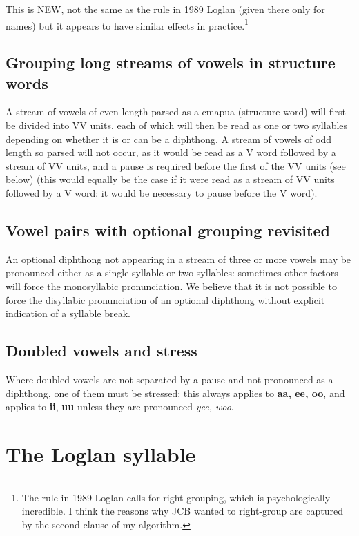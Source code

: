 \documentclass[12pt]{book}
\begin{document}
This is NEW, not the same as the rule in 1989 Loglan (given there only for names) but it appears to have similar effects in practice.\footnote{The rule in 1989 Loglan calls for right-grouping, which is psychologically incredible.  I think the reasons why JCB wanted to right-group are captured by the second clause of my algorithm.}

\subsection{Grouping long streams of vowels in structure words}

A stream of vowels of even length parsed as a cmapua (structure word) will first be divided into VV units, each of which will then be read as one or two syllables depending on whether it is or can be a diphthong.  A stream of vowels of odd length so parsed will not occur, as it would be read as a V word followed by a stream of VV units, and a pause is required before the first of the VV units (see below) (this would equally be the case if it were read as a stream of VV units followed by a V word:  it would be necessary to pause before the V word).

\subsection{Vowel pairs with optional grouping revisited}

An optional diphthong not appearing in a stream of three or more vowels may be pronounced either as a single syllable or two syllables:  sometimes other factors will force the monosyllabic pronunciation.  We believe that it is not possible to force the disyllabic pronunciation of an optional diphthong without explicit indication of a syllable break.

\subsection{Doubled vowels and stress}

Where doubled vowels are not separated by a pause and not pronounced as a diphthong, one of them must be stressed:  this always applies to {\bf aa, ee, oo}, and applies
to {\bf ii}, {\bf uu} unless they are pronounced {\em yee, woo}.

\section{The Loglan syllable}
\end{document}
